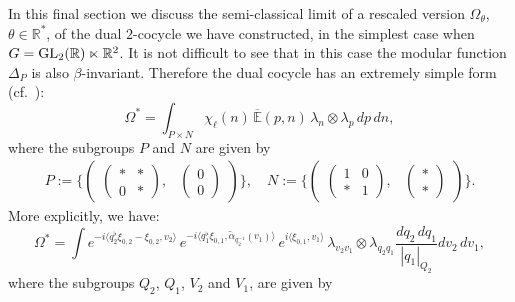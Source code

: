 \documentclass[a4paper,11pt,reqno]{amsart}
\numberwithin{equation}{section}
\theoremstyle{remark}
\theoremstyle{definition}
\newcommand{\R}{{\mathbb R}}
\newcommand{\E}{\mathbb E}
\begin{document}
In this final section we discuss the semi-classical limit of a rescaled version $\Omega_\theta$, $\theta\in\R^*$, of the dual $2$-cocycle we have constructed,
in the simplest case when $G={\rm GL}_2(\R)\ltimes\R^2$. It is not difficult to see that in this case the modular function $\Delta_P$ is also $\beta$-invariant.
Therefore  the dual cocycle has an extremely simple form (cf.~\cite{BGNT3}):
$$
\Omega^*=\int_{P\times N}
\chi_\ell(n)\,\overline{\E}(p,n)
\,\lambda_{n}\otimes \lambda_{p}\, dp\, dn,
$$
where the subgroups $P$ and $N$ are given by
\begin{align*}
P:=\bigg\{\begin{pmatrix} \begin{pmatrix}*&*\\0&*\end{pmatrix},&\!\!\!\!\begin{pmatrix}0\\0\end{pmatrix}\end{pmatrix}\bigg\},
\quad
N:=\bigg\{\begin{pmatrix} \begin{pmatrix}1&0\\ *&1\end{pmatrix},&\!\!\!\!\begin{pmatrix}*\\ *\end{pmatrix}\end{pmatrix}\bigg\}.
\end{align*}
More explicitly, we have:
$$
\Omega^*=\int
e^{-i\langle q_2^\flat\xi_{0,2}-\xi_{0,2},v_2\rangle}\,
e^{-i\langle q_1^\flat\xi_{0,1},\tilde\alpha_{q_2^{-1}}(v_1)\rangle}\,e^{i\langle\xi_{0,1},v_1\rangle}\,
\lambda_{v_2v_1}\otimes\lambda_{q_2q_1}\frac{dq_2\, dq_1}{|q_1|_{Q_2}}dv_2\, dv_1,
$$
where  the
 subgroups $Q_2$, $Q_1$, $V_2$ and $V_1$, are given by
\end{document}
